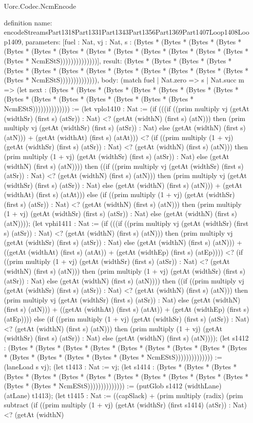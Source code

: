 \begin{lexlean}{Uorc.Codec.NcmEncode}
\begin{semanticmodule}
definition{
  name: encodeStreamsPart1318Part1331Part1343Part1356Part1369Part1407Loop1408Loop1409,
  parameters: [fuel : Nat, vj : Nat, s : (Bytes * (Bytes * (Bytes * (Bytes * (Bytes * (Bytes * (Bytes * (Bytes * (Bytes * (Bytes * (Bytes * (Bytes * (Bytes * (Bytes * NcmEStS))))))))))))))],
  result: (Bytes * (Bytes * (Bytes * (Bytes * (Bytes * (Bytes * (Bytes * (Bytes * (Bytes * (Bytes * (Bytes * (Bytes * (Bytes * (Bytes * NcmEStS)))))))))))))),
  body: (match fuel
    | Nat.zero => s
    | Nat.succ m => (let next : (Bytes * (Bytes * (Bytes * (Bytes * (Bytes * (Bytes * (Bytes * (Bytes * (Bytes * (Bytes * (Bytes * (Bytes * (Bytes * (Bytes * NcmEStS)))))))))))))) := (let vplo1410 : Nat := (if (((if ((prim multiply vj (getAt (widthSr) (first s) (atSr)) : Nat) <? (getAt (widthN) (first s) (atN))) then (prim multiply vj (getAt (widthSr) (first s) (atSr)) : Nat) else (getAt (widthN) (first s) (atN))) + (getAt (widthAt) (first s) (atAt))) <? (if ((prim multiply (1 + vj) (getAt (widthSr) (first s) (atSr)) : Nat) <? (getAt (widthN) (first s) (atN))) then (prim multiply (1 + vj) (getAt (widthSr) (first s) (atSr)) : Nat) else (getAt (widthN) (first s) (atN)))) then ((if ((prim multiply vj (getAt (widthSr) (first s) (atSr)) : Nat) <? (getAt (widthN) (first s) (atN))) then (prim multiply vj (getAt (widthSr) (first s) (atSr)) : Nat) else (getAt (widthN) (first s) (atN))) + (getAt (widthAt) (first s) (atAt))) else (if ((prim multiply (1 + vj) (getAt (widthSr) (first s) (atSr)) : Nat) <? (getAt (widthN) (first s) (atN))) then (prim multiply (1 + vj) (getAt (widthSr) (first s) (atSr)) : Nat) else (getAt (widthN) (first s) (atN)))); (let vphi1411 : Nat := (if (((if ((prim multiply vj (getAt (widthSr) (first s) (atSr)) : Nat) <? (getAt (widthN) (first s) (atN))) then (prim multiply vj (getAt (widthSr) (first s) (atSr)) : Nat) else (getAt (widthN) (first s) (atN))) + ((getAt (widthAt) (first s) (atAt)) + (getAt (widthEp) (first s) (atEp)))) <? (if ((prim multiply (1 + vj) (getAt (widthSr) (first s) (atSr)) : Nat) <? (getAt (widthN) (first s) (atN))) then (prim multiply (1 + vj) (getAt (widthSr) (first s) (atSr)) : Nat) else (getAt (widthN) (first s) (atN)))) then ((if ((prim multiply vj (getAt (widthSr) (first s) (atSr)) : Nat) <? (getAt (widthN) (first s) (atN))) then (prim multiply vj (getAt (widthSr) (first s) (atSr)) : Nat) else (getAt (widthN) (first s) (atN))) + ((getAt (widthAt) (first s) (atAt)) + (getAt (widthEp) (first s) (atEp)))) else (if ((prim multiply (1 + vj) (getAt (widthSr) (first s) (atSr)) : Nat) <? (getAt (widthN) (first s) (atN))) then (prim multiply (1 + vj) (getAt (widthSr) (first s) (atSr)) : Nat) else (getAt (widthN) (first s) (atN)))); (let s1412 : (Bytes * (Bytes * (Bytes * (Bytes * (Bytes * (Bytes * (Bytes * (Bytes * (Bytes * (Bytes * (Bytes * (Bytes * (Bytes * (Bytes * NcmEStS)))))))))))))) := (laneLoad s vj); (let t1413 : Nat := vj; (let s1414 : (Bytes * (Bytes * (Bytes * (Bytes * (Bytes * (Bytes * (Bytes * (Bytes * (Bytes * (Bytes * (Bytes * (Bytes * (Bytes * (Bytes * NcmEStS)))))))))))))) := (putGlob s1412 (widthLane) (atLane) t1413); (let t1415 : Nat := ((capSlack) + (prim multiply (radix) (prim subtract (if ((prim multiply (1 + vj) (getAt (widthSr) (first s1414) (atSr)) : Nat) <? (getAt (widthN) }
\end{semanticmodule}
\end{lexlean}
